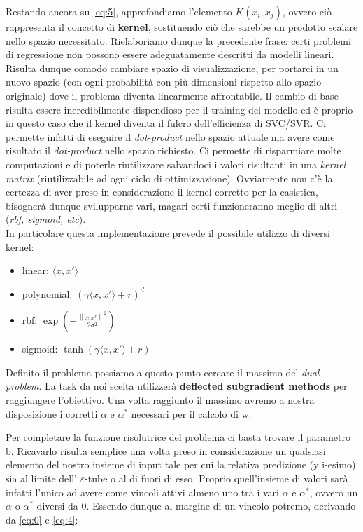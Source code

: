 \documentclass[12pt]{article}
\newcommand{\norm}[1]{\left\lVert#1\right\rVert}
\begin{document}

	Restando ancora su \eqref{eq:5}, approfondiamo l'elemento $K(x_i,x_j)$, ovvero ciò rappresenta il concetto di \textbf{kernel}, sostituendo ciò che sarebbe un prodotto scalare nello spazio necessitato. Rielaboriamo dunque la precedente frase: certi problemi di regressione non possono essere adeguatamente descritti da modelli lineari. Risulta dunque comodo cambiare spazio di visualizzazione, per portarci in un nuovo spazio (con ogni probabilità con più dimensioni rispetto allo spazio originale) dove il problema diventa linearmente affrontabile. Il cambio di base risulta essere incredibilmente dispendioso per il training del modello ed è proprio in questo caso che il kernel diventa il fulcro dell’efficienza di SVC/SVR. Ci permette infatti di eseguire il \textit{dot-product} nello spazio attuale ma avere come risultato il \textit{dot-product} nello spazio richiesto. Ci permette di risparmiare molte computazioni e di poterle riutilizzare salvandoci i valori risultanti in una \textit{kernel matrix} (riutilizzabile ad ogni ciclo di ottimizzazione). Ovviamente non c’è la certezza di aver preso in considerazione il kernel corretto per la casistica, bisognerà dunque svilupparne vari, magari certi funzioneranno meglio di altri (\textit{rbf, sigmoid, etc}).\\
In particolare questa implementazione prevede il possibile utilizzo di diversi kernel:
	\begin{itemize}
		\item linear: $\langle x,x' \rangle$
		\item polynomial: $(\gamma\langle x,x' \rangle + r)^d$
		\item rbf: $\exp(-\frac{\norm{x \  x'}^2}{2\sigma^2})$
		\item sigmoid: $\tanh(\gamma\langle x,x' \rangle + r)$
	\end{itemize}

	Definito il problema possiamo a questo punto cercare il massimo del \textit{dual problem}. La task da noi scelta utilizzerà \textbf{deflected subgradient methods} per raggiungere l’obiettivo. Una volta raggiunto il massimo avremo a nostra disposizione i corretti $\alpha$ e $\alpha^*$ necessari per il calcolo di w. 

	Per completare la funzione risolutrice del problema ci basta trovare il parametro b. Ricavarlo risulta semplice una volta preso in considerazione un qualsiasi elemento del nostro insieme di input tale per cui la relativa predizione (y i-esimo) sia al limite dell’ $\varepsilon$-tube o al di fuori di esso. Proprio quell’insieme di valori sarà infatti l’unico ad avere come vincoli attivi almeno uno tra i vari $\alpha$ e $\alpha^*$, ovvero un $\alpha$ o $\alpha^*$ diversi da 0. Essendo dunque al margine di un vincolo potremo, derivando da \eqref{eq:0} e \eqref{eq:4}:
\end{document}
